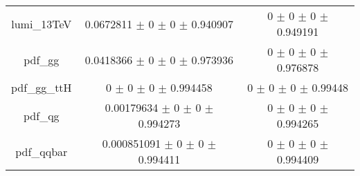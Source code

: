 \begin{table}
\begin{tabular}{ccc}
lumi\_13TeV & \num{0.0672811} $\pm$ \num{0} $\pm$ \num{0} $\pm$ \num{0.940907} & \num{0} $\pm$ \num{0} $\pm$ \num{0} $\pm$ \num{0.949191}\\
pdf\_gg & \num{0.0418366} $\pm$ \num{0} $\pm$ \num{0} $\pm$ \num{0.973936} & \num{0} $\pm$ \num{0} $\pm$ \num{0} $\pm$ \num{0.976878}\\
pdf\_gg\_ttH & \num{0} $\pm$ \num{0} $\pm$ \num{0} $\pm$ \num{0.994458} & \num{0} $\pm$ \num{0} $\pm$ \num{0} $\pm$ \num{0.99448}\\
pdf\_qg & \num{0.00179634} $\pm$ \num{0} $\pm$ \num{0} $\pm$ \num{0.994273} & \num{0} $\pm$ \num{0} $\pm$ \num{0} $\pm$ \num{0.994265}\\
pdf\_qqbar & \num{0.000851091} $\pm$ \num{0} $\pm$ \num{0} $\pm$ \num{0.994411} & \num{0} $\pm$ \num{0} $\pm$ \num{0} $\pm$ \num{0.994409}\\
\bottomrule
\end{tabular}
\end{table}